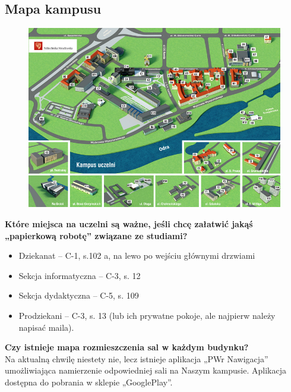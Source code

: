 \documentclass[11pt]{article}
\begin{document}
\subsection{Mapa kampusu}
\begin{figure}[H]
    \centering
    \includegraphics[width=\linewidth]{mapa.png}
\end{figure}

\textbf{Które miejsca na uczelni są ważne, jeśli chcę załatwić jakąś „papierkową robotę” związane ze studiami?}
\begin{itemize}
\item Dziekanat – C-1, s.102 a, na lewo po wejściu głównymi drzwiami
\item Sekcja informatyczna – C-3, s. 12
\item Sekcja dydaktyczna – C-5, s. 109
\item Prodziekani – C-3, s. 13 (lub ich prywatne pokoje, ale najpierw należy napisać maila).
\end{itemize}
\textbf{Czy istnieje mapa rozmieszczenia sal w każdym budynku?}\\
\indent Na aktualną chwilę niestety nie, lecz istnieje aplikacja „PWr Nawigacja” umożliwiająca namierzenie odpowiedniej sali na Naszym kampusie. Aplikacja dostępna do pobrania w sklepie „GooglePlay”.

\newpage
\end{document}
